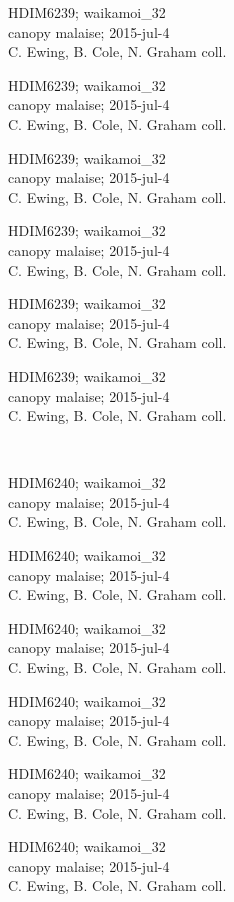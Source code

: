 \documentclass[2pt]{extarticle}
\begin{document}
\noindent
\parbox{0.16\textwidth}{\tiny \raggedright \rule[-0.3\baselineskip]{0pt}{10pt}HDIM6239; waikamoi\_32\\ canopy malaise; 2015-jul-4\\ C. Ewing, B. Cole, N. Graham coll.}
\parbox{0.16\textwidth}{\tiny \raggedright \rule[-0.3\baselineskip]{0pt}{10pt}HDIM6239; waikamoi\_32\\ canopy malaise; 2015-jul-4\\ C. Ewing, B. Cole, N. Graham coll.}
\parbox{0.16\textwidth}{\tiny \raggedright \rule[-0.3\baselineskip]{0pt}{10pt}HDIM6239; waikamoi\_32\\ canopy malaise; 2015-jul-4\\ C. Ewing, B. Cole, N. Graham coll.}
\parbox{0.16\textwidth}{\tiny \raggedright \rule[-0.3\baselineskip]{0pt}{10pt}HDIM6239; waikamoi\_32\\ canopy malaise; 2015-jul-4\\ C. Ewing, B. Cole, N. Graham coll.}
\parbox{0.16\textwidth}{\tiny \raggedright \rule[-0.3\baselineskip]{0pt}{10pt}HDIM6239; waikamoi\_32\\ canopy malaise; 2015-jul-4\\ C. Ewing, B. Cole, N. Graham coll.}
\parbox{0.16\textwidth}{\tiny \raggedright \rule[-0.3\baselineskip]{0pt}{10pt}HDIM6239; waikamoi\_32\\ canopy malaise; 2015-jul-4\\ C. Ewing, B. Cole, N. Graham coll.} \\ 
\vspace{0.001in} 

\noindent
\parbox{0.16\textwidth}{\tiny \raggedright \rule[-0.3\baselineskip]{0pt}{10pt}HDIM6240; waikamoi\_32\\ canopy malaise; 2015-jul-4\\ C. Ewing, B. Cole, N. Graham coll.}
\parbox{0.16\textwidth}{\tiny \raggedright \rule[-0.3\baselineskip]{0pt}{10pt}HDIM6240; waikamoi\_32\\ canopy malaise; 2015-jul-4\\ C. Ewing, B. Cole, N. Graham coll.}
\parbox{0.16\textwidth}{\tiny \raggedright \rule[-0.3\baselineskip]{0pt}{10pt}HDIM6240; waikamoi\_32\\ canopy malaise; 2015-jul-4\\ C. Ewing, B. Cole, N. Graham coll.}
\parbox{0.16\textwidth}{\tiny \raggedright \rule[-0.3\baselineskip]{0pt}{10pt}HDIM6240; waikamoi\_32\\ canopy malaise; 2015-jul-4\\ C. Ewing, B. Cole, N. Graham coll.}
\parbox{0.16\textwidth}{\tiny \raggedright \rule[-0.3\baselineskip]{0pt}{10pt}HDIM6240; waikamoi\_32\\ canopy malaise; 2015-jul-4\\ C. Ewing, B. Cole, N. Graham coll.}
\parbox{0.16\textwidth}{\tiny \raggedright \rule[-0.3\baselineskip]{0pt}{10pt}HDIM6240; waikamoi\_32\\ canopy malaise; 2015-jul-4\\ C. Ewing, B. Cole, N. Graham coll.} \\ 
\vspace{0.001in} 
\end{document}
